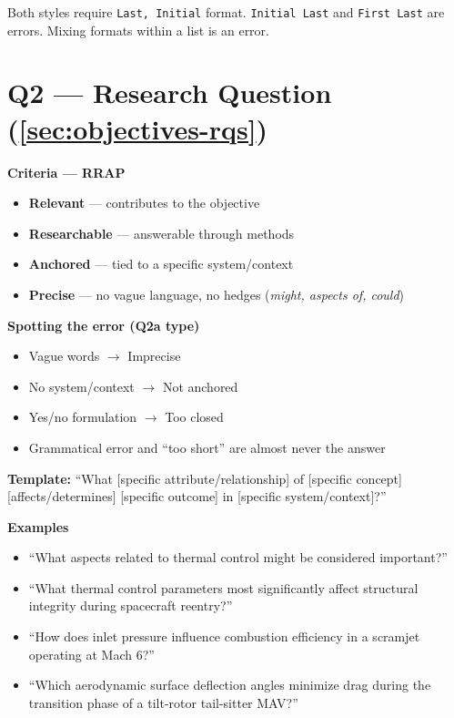 \documentclass[../main.tex]{subfiles}
\begin{document}
Both styles require \texttt{Last, Initial} format. \texttt{Initial Last} and \texttt{First Last} are errors. Mixing formats within a list is an error.

\section*{Q2 — Research Question (\autoref{sec:objectives-rqs})}

\textbf{Criteria — RRAP}
\begin{itemize}
  \item \textbf{Relevant} — contributes to the objective
  \item \textbf{Researchable} — answerable through methods
  \item \textbf{Anchored} — tied to a specific system/context
  \item \textbf{Precise} — no vague language, no hedges (\emph{might, aspects of, could})
\end{itemize}

\textbf{Spotting the error (Q2a type)}
\begin{itemize}
  \item Vague words $\to$ Imprecise
  \item No system/context $\to$ Not anchored
  \item Yes/no formulation $\to$ Too closed
  \item Grammatical error and ``too short'' are almost never the answer
\end{itemize}

\textbf{Template:} ``What [specific attribute/relationship] of [specific concept] [affects/determines] [specific outcome] in [specific system/context]?''

\textbf{Examples}
\begin{itemize}
  \item[$\times$] ``What aspects related to thermal control might be considered important?''
  \item[$\checkmark$] ``What thermal control parameters most significantly affect structural integrity during spacecraft reentry?''
  \item[$\checkmark$] ``How does inlet pressure influence combustion efficiency in a scramjet operating at Mach 6?''
  \item[$\checkmark$] ``Which aerodynamic surface deflection angles minimize drag during the transition phase of a tilt-rotor tail-sitter MAV?''
\end{itemize}
\end{document}
